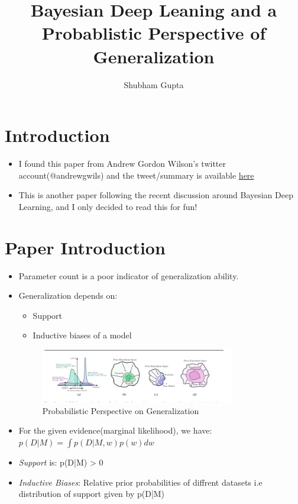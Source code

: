 \documentclass[a4paper]{article}
\title{Bayesian Deep Leaning and a Probablistic Perspective of Generalization}
\author{Shubham Gupta}
\begin{document}
\maketitle
\section{Introduction}
\begin{itemize}
    \item I found this paper from Andrew Gordon Wilson's twitter account(@andrewgwils) and the tweet/summary is available \href{https://twitter.com/andrewgwils/status/1230669857840123906}{here}
    \item This is another paper following the recent discussion around Bayesian Deep Learning, and I only decided to read this for fun!
\end{itemize}
\section{Paper Introduction}
\begin{itemize}
    \item Parameter count is a poor indicator of generalization ability.
    \item Generalization depends on:
    \begin{itemize}
        \item Support
        \item Inductive biases of a model
    \end{itemize}
    \begin{figure}[H]
        \centering
        \includegraphics[width=0.8\textwidth]{prob_perspective}
        \caption{Probabilistic Perspective on Generalization}
        \label{fig:prob_perspective}
    \end{figure}
    \item For the given evidence(marginal likelihood), we have: $p(D|M) = \int p(D|M, w)p(w)dw$
    \item \textit{Support} is: p(D|M) > 0
    \item \textit{Inductive Biases}: Relative prior probabilities of diffrent datasets i.e distribution of support given by p(D|M)
\end{itemize}
\end{document}
